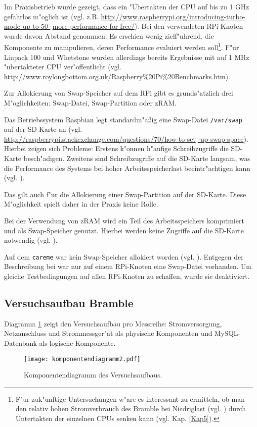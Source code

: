 Im Praxisbetrieb wurde gezeigt, dass ein "Ubertakten der CPU auf bis zu 1 GHz gefahrlos m"oglich ist (vgl. z.B. \url{http://www.raspberrypi.org/introducing-turbo-mode-up-to-50-} \url{more-performance-for-free/}). Bei den verwendeten RPi-Knoten wurde davon Abstand genommen. Es erschien wenig zielf"uhrend, die Komponente zu manipulieren, deren Performance evaluiert werden soll\footnote{F"ur zuk"unftige Untersuchungen w"are es interessant zu ermitteln, ob man den relativ hohen Stromverbrauch des Bramble bei Niedriglast (vgl. \cite{kli13}) durch Untertakten der einzelnen CPUs senken kann (vgl. Kap. \ref{Kap5}).}. F"ur Linpack 100 und Whetstone wurden allerdings bereits Ergebnisse mit auf 1 MHz "ubertakteter CPU ver"offentlicht (vgl. \url{http://www.roylongbottom.org.uk/Raspberry\%20Pi\%20Benchmarks.htm}).

Zur Allokierung von Swap-Speicher auf dem RPi gibt es grunds"atzlich drei M"oglichkeiten: Swap-Datei, Swap-Partition oder zRAM. 

Das Betriebssystem Raspbian legt standardm"a\ss ig eine Swap-Datei \texttt{/var/swap} auf der SD-Karte an (vgl. \url{http://raspberrypi.stackexchange.com/questions/70/how-to-set} \url{-up-swap-space}). Hierbei zeigen sich Probleme: Erstens k"onnen h"aufige Schreibzugriffe die SD-Karte besch"adigen. Zweitens sind Schreibzugriffe auf die SD-Karte langsam, was die Performance des Systems bei hoher Arbeitsspeicherlast beeintr"achtigen kann (vgl. \cite{pow12}). 

Das gilt auch f"ur die Allokierung einer Swap-Partition auf der SD-Karte. Diese M"oglichkeit spielt daher in der Praxis keine Rolle. 

Bei der Verwendung von zRAM wird ein Teil des Arbeitsspeichers komprimiert und als Swap-Speicher genutzt. Hierbei werden keine Zugriffe auf die SD-Karte notwendig (vgl. \cite{pow12}). 

Auf dem \texttt{careme} war kein Swap-Speicher allokiert worden (vgl. \cite{kli13}). Entgegen der Beschreibung bei war nur auf einem RPi-Knoten eine Swap-Datei vorhanden. Um gleiche Testbedingungen auf allen RPi-Knoten zu schaffen, wurde sie deaktiviert. 

\subsection{Versuchsaufbau Bramble}\label{Bramble-Versuchsaufbau}

Diagramm \ref{fig:Komponentendiagramm} zeigt den Versuchsaufbau pro Messreihe: Stromversorgung, Netzanschluss und Strommessger"at als physische Komponenten und MySQL-Datenbank als logische Komponente. 
\begin{figure}[htb]
  \centering
  \centerline{\texttt{[image: komponentendiagramm2.pdf]}} 
  \caption{Komponentendiagramm des Versuchsaufbaus.}
  \label{fig:Komponentendiagramm}		
\end{figure}
